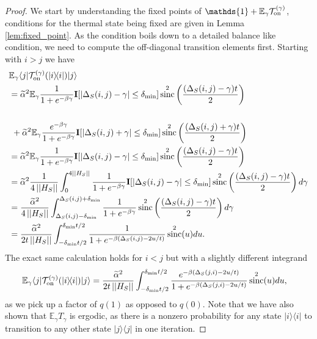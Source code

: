 \documentclass{article}
\newcommand{\on}{\rm on}
\newcommand{\ket}[1]{|#1\rangle}
\newcommand{\bra}[1]{\langle #1|}
\newcommand{\ketbra}[2]{| #1\rangle\! \langle #2|}
\newcommand{\norm}[1]{\left|\left| #1 \right|\right|}
\newcommand{\EE}{\mathbb{E}}
\newcommand{\TT}{\mathcal{T}}
\newcommand{\identity}{\mathds{1}}
\DeclareMathOperator{\sinc}{sinc}
\begin{document}
\begin{proof}
    We start by understanding the fixed points of $\identity + \EE_\gamma \TT_{\on}^{(\gamma)}$, conditions for the thermal state being fixed are given in Lemma \ref{lem:fixed_point}. As the condition boils down to a detailed balance like condition, we need to compute the off-diagonal transition elements first. Starting with $i > j$ we have
    \begin{align}
        &\EE_\gamma \bra{j} \TT_{\on}^{(\gamma)}(\ketbra{i}{i})\ket{j} \nonumber \\
        &=  \widetilde{\alpha}^2 \EE_{\gamma} \frac{1}{1 + e^{-\beta \gamma}} \mathbf{I}[|\Delta_S(i,j) - \gamma| \le \delta_{\min}]  \sinc^2\left(\frac{(\Delta_S(i,j) - \gamma)t}{2}\right) \\ \nonumber \\
        &~+ \widetilde{\alpha}^2 \EE_{\gamma} \frac{e^{-\beta \gamma}}{1 + e^{-\beta \gamma}} \mathbf{I}[|\Delta_S(i,j) + \gamma| \le \delta_{\min}]  \sinc^2\left(\frac{(\Delta_S(i,j) + \gamma)t}{2}\right) \\
        &= \widetilde{\alpha}^2 \EE_{\gamma} \frac{1}{1 + e^{-\beta \gamma}} \mathbf{I}[|\Delta_S(i,j) - \gamma| \le \delta_{\min}]  \sinc^2\left(\frac{(\Delta_S(i,j) - \gamma)t}{2}\right) \\
        &= \widetilde{\alpha}^2 \frac{1}{4 \norm{H_S}} \int_{0}^{4 \norm{H_S}} \frac{1}{1 + e^{-\beta \gamma}} \mathbf{I}[|\Delta_S(i,j) - \gamma| \le \delta_{\min}]  \sinc^2\left(\frac{(\Delta_S(i,j) - \gamma)t}{2}\right) d\gamma \\
        &=  \frac{\widetilde{\alpha}^2}{4 \norm{H_S}} \int_{\Delta_S(i,j) - \delta_{\min}}^{\Delta_S(i,j) + \delta_{\min}} \frac{1}{1 + e^{-\beta \gamma}}  \sinc^2\left(\frac{(\Delta_S(i,j) - \gamma)t}{2}\right) d\gamma \\
        &= \frac{\widetilde{\alpha}^2}{2 t \norm{H_S}} \int_{-\delta_{\min} t /2}^{\delta_{\min} t / 2} \frac{1}{1 + e^{-\beta (\Delta_S(i, j) - 2 u /t)}} \sinc^2(u) du. \label{eq:zero_knowledge_transition_1}
    \end{align}
    The exact same calculation holds for $i < j$ but with a slightly different integrand
    \begin{align}
        \EE_\gamma \bra{j} \TT_{\on}^{(\gamma)}(\ketbra{i}{i})\ket{j} &= \frac{\widetilde{\alpha}^2}{2 t \norm{H_S}} \int_{-\delta_{\min} t /2}^{\delta_{\min} t / 2} \frac{e^{-\beta (\Delta_S(j,i) - 2 u /t)}}{1 + e^{-\beta (\Delta_S(j,i) - 2 u /t)}} \sinc^2(u) du,\label{eq:zero_knowledge_transition_2}
    \end{align}
    as we pick up a factor of $q(1)$ as opposed to $q(0)$. Note that we have also shown that $\EE_\gamma T_\gamma$ is ergodic, as there is a nonzero probability for any state $\ketbra{i}{i}$ to transition to any other state $\ketbra{j}{j}$ in one iteration.


\end{proof}
\end{document}

